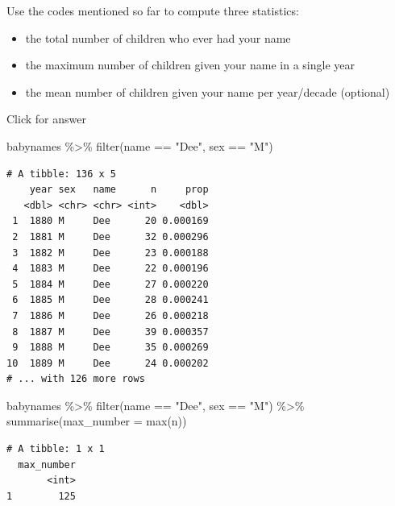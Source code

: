 \documentclass[
]{book}
\newenvironment{Shaded}{\begin{snugshade}}{\end{snugshade}}
\newcommand{\AttributeTok}[1]{\textcolor[rgb]{0.77,0.63,0.00}{#1}}
\newcommand{\FunctionTok}[1]{\textcolor[rgb]{0.00,0.00,0.00}{#1}}
\newcommand{\NormalTok}[1]{#1}
\newcommand{\SpecialCharTok}[1]{\textcolor[rgb]{0.00,0.00,0.00}{#1}}
\newcommand{\StringTok}[1]{\textcolor[rgb]{0.31,0.60,0.02}{#1}}
\providecommand{\tightlist}{%
  \setlength{\itemsep}{0pt}\setlength{\parskip}{0pt}}
\begin{document}
Use the codes mentioned so far to compute three statistics:

\begin{itemize}
\tightlist
\item
  the total number of children who ever had your name
\item
  the maximum number of children given your name in a single year
\item
  the mean number of children given your name per year/decade (optional)
\end{itemize}

Click for answer

\begin{Shaded}
\begin{Highlighting}[]
\NormalTok{babynames }\SpecialCharTok{\%\textgreater{}\%} 
  \FunctionTok{filter}\NormalTok{(name }\SpecialCharTok{==} \StringTok{"Dee"}\NormalTok{, sex }\SpecialCharTok{==} \StringTok{"M"}\NormalTok{)}
\end{Highlighting}
\end{Shaded}

\begin{verbatim}
# A tibble: 136 x 5
    year sex   name      n     prop
   <dbl> <chr> <chr> <int>    <dbl>
 1  1880 M     Dee      20 0.000169
 2  1881 M     Dee      32 0.000296
 3  1882 M     Dee      23 0.000188
 4  1883 M     Dee      22 0.000196
 5  1884 M     Dee      27 0.000220
 6  1885 M     Dee      28 0.000241
 7  1886 M     Dee      26 0.000218
 8  1887 M     Dee      39 0.000357
 9  1888 M     Dee      35 0.000269
10  1889 M     Dee      24 0.000202
# ... with 126 more rows
\end{verbatim}

\begin{Shaded}
\begin{Highlighting}[]
\NormalTok{babynames }\SpecialCharTok{\%\textgreater{}\%} 
  \FunctionTok{filter}\NormalTok{(name }\SpecialCharTok{==} \StringTok{"Dee"}\NormalTok{, sex }\SpecialCharTok{==} \StringTok{"M"}\NormalTok{) }\SpecialCharTok{\%\textgreater{}\%} 
  \FunctionTok{summarise}\NormalTok{(}\AttributeTok{max\_number =} \FunctionTok{max}\NormalTok{(n))}
\end{Highlighting}
\end{Shaded}

\begin{verbatim}
# A tibble: 1 x 1
  max_number
       <int>
1        125
\end{verbatim}
\end{document}
